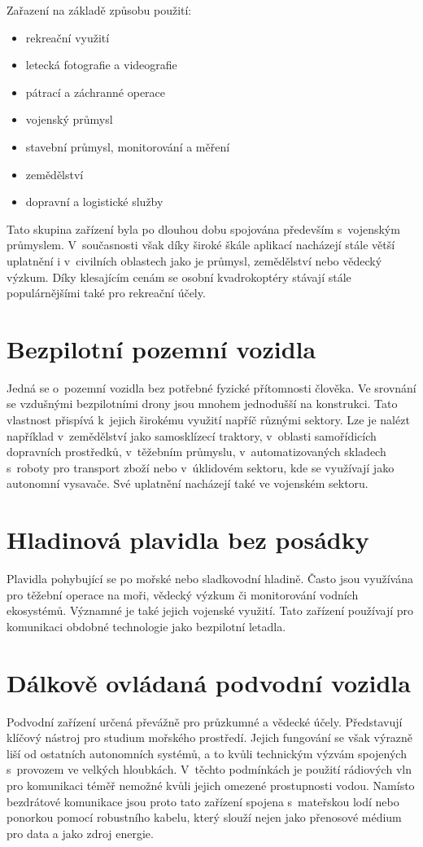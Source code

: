 \documentclass[12pt]{report}
\begin{document}
Zařazení na základě způsobu použití:
\begin{itemize}
	\item rekreační využití
	\item letecká fotografie a videografie
	\item pátrací a záchranné operace
	\item vojenský průmysl
	\item stavební průmysl, monitorování a měření
	\item zemědělství
	\item dopravní a logistické služby
\end{itemize}

Tato skupina zařízení byla po dlouhou dobu spojována především s~vojenským průmyslem. V~současnosti však díky široké škále aplikací nacházejí stále větší uplatnění i v~civilních oblastech jako je průmysl, zemědělství nebo vědecký výzkum. Díky klesajícím cenám se osobní kvadrokoptéry stávají stále populárnějšími také pro rekreační účely. \cite{mainbook} \cite{whatisadrone}

\section[Bezpilotní pozemní vozidla]{Bezpilotní pozemní vozidla}
Jedná se o~pozemní vozidla bez potřebné fyzické přítomnosti člověka. Ve srovnání se vzdušnými bezpilotními drony jsou mnohem jednodušší na konstrukci. Tato vlastnost přispívá k~jejich širokému využití napříč různými sektory. Lze je nalézt například v~zemědělství jako samosklízecí traktory, v~oblasti samořídicích dopravních prostředků, v~těžebním průmyslu, v~automatizovaných skladech s~roboty pro transport zboží nebo v~úklidovém sektoru, kde se využívají jako autonomní vysavače. Své uplatnění nacházejí také ve vojenském sektoru. \cite{mainbook}

\section[Hladinová plavidla bez posádky]{Hladinová plavidla bez posádky}
Plavidla pohybující se po mořské nebo sladkovodní hladině. Často jsou využívána pro těžební operace na moři, vědecký výzkum či monitorování vodních ekosystémů. Významné je také jejich vojenské využití. Tato zařízení používají pro komunikaci obdobné technologie jako bezpilotní letadla. \cite{mainbook}

\section[Dálkově ovládaná podvodní vozidla]{Dálkově ovládaná podvodní vozidla}
Podvodní zařízení určená převážně pro průzkumné a vědecké účely. Představují klíčový nástroj pro studium mořského prostředí. Jejich fungování se však výrazně liší od ostatních autonomních systémů, a to kvůli technickým výzvám spojených s~provozem ve velkých hloubkách. V~těchto podmínkách je použití rádiových vln pro komunikaci téměř nemožné kvůli jejich omezené prostupnosti vodou. Namísto bezdrátové komunikace jsou proto tato zařízení spojena s~mateřskou lodí nebo ponorkou pomocí robustního kabelu, který slouží nejen jako přenosové médium pro data a jako zdroj energie. \cite{mainbook}
\end{document}
